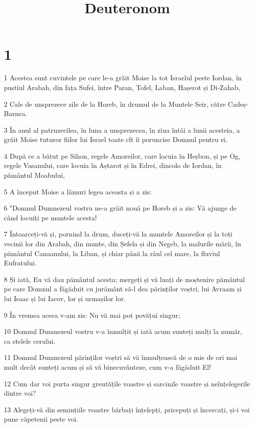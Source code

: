 

\title{Deuteronom}


\chapter{1}

\par 1 Acestea sunt cuvintele pe care le-a grăit Moise la tot Israelul peste Iordan, în pustiul Arabah, din fața Sufei, între Paran, Tofel, Laban, Hașerot și Di-Zahab,
\par 2 Cale de unsprezece zile de la Horeb, în drumul de la Muntele Seir, către Cadeș-Barnea.
\par 3 În anul al patruzecilea, în luna a unsprezecea, în ziua întâi a lunii acesteia, a grăit Moise tuturor fiilor lui Israel toate cît îi poruncise Domnul pentru ei.
\par 4 După ce a bătut pe Sihon, regele Amoreilor, care locuia în Heșbon, și pe Og, regele Vasanului, care locuia în Aștarot și în Edrei, dincolo de Iordan, în pământul Moabului,
\par 5 A început Moise a lămuri legea aceasta și a zis:
\par 6 "Domnul Dumnezeul vostru ne-a grăit nouă pe Horeb și a zis: Vă ajunge de când locuiți pe muntele acesta!
\par 7 Întoarceți-vă și, pornind la drum, duceți-vă la muntele Amoreilor și la toți vecinii lor din Arabah, din munte, din Șefela și din Negeb, la malurile mării, în pământul Canaanului, la Liban, și chiar până la râul cel mare, la fluviul Eufratului.
\par 8 Și iată, Eu vă dau pământul acesta; mergeți și vă luați de moștenire pământul pe care Domnul a făgăduit cu jurământ să-l dea părinților voștri, lui Avraam și lui Isaac și lui Iacov, lor și urmașilor lor.
\par 9 În vremea aceea v-am zis: Nu vă mai pot povățui singur;
\par 10 Domnul Dumnezeul vostru v-a înmulțit și iată acum sunteți mulți la număr, ca stelele cerului.
\par 11 Domnul Dumnezeul părinților voștri să vă înmulțească de o mie de ori mai mult decât sunteți acum și să vă binecuvânteze, cum v-a făgăduit El!
\par 12 Cum dar voi purta singur greutățile voastre și sarcinile voastre și neînțelegerile dintre voi?
\par 13 Alegeți-vă din semințiile voastre bărbați înțelepți, pricepuți și încercați, și-i voi pune căpetenii peste voi.

